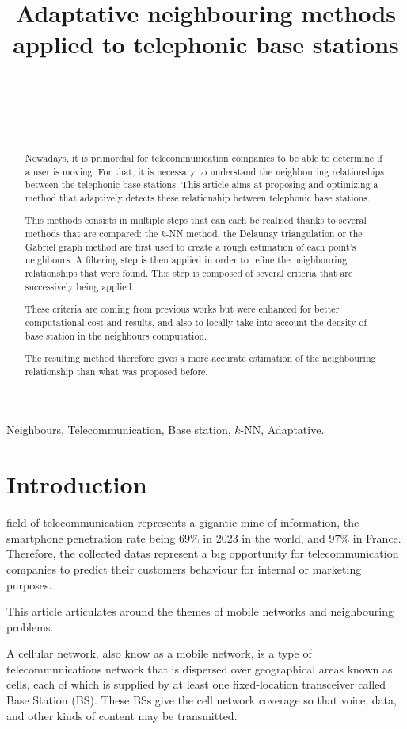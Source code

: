 \documentclass[lettersize,journal,english]{IEEEtran}
\title{Adaptative neighbouring methods applied to telephonic base stations}
\author{\IEEEauthorblockN{Paul MÉHAUD}\\
\IEEEauthorblockA{\textit{Intern at CTU in Prague} \\
\textit{INSA Rouen Normandie}\\
paul.mehaud@insa-rouen.fr}\\
\and
\IEEEauthorblockN{Brendan SÉVELLEC}\\
\IEEEauthorblockA{\textit{Intern at CTU in Prague} \\
\textit{INSA Rouen Normandie}\\
brendan.sevellec@insa-rouen.fr}}
\begin{document}
\maketitle

\begin{abstract}
    Nowadays, it is primordial for telecommunication companies to be able to determine if a user is moving. For that, it is necessary to understand the neighbouring relationships between the telephonic base stations. This article aims at proposing and optimizing a method that adaptively detects these relationship between telephonic base stations. 
    
    This methods consists in multiple steps that can each be realised thanks to several methods that are compared: the $k$-NN method, the Delaunay triangulation or the Gabriel graph method are first used to create a rough estimation of each point's neighbours. A filtering step is then applied in order to refine the neighbouring relationships that were found. This step is composed of several criteria that are successively being applied. 
    
    These criteria are coming from previous works but were enhanced for better computational cost and results, and also to locally take into account the density of base station in the neighbours computation. 
    
    The resulting method therefore gives a more accurate estimation of the neighbouring relationship than what was proposed before.
\end{abstract}

\begin{IEEEkeywords}
    Neighbours, Telecommunication, Base station, $k$-NN, Adaptative.
\end{IEEEkeywords}

\section{Introduction}
     field of telecommunication represents a gigantic mine of information, the smartphone penetration rate being $69\%$ in 2023 in the world, and $97\%$ in France. Therefore, the collected datas represent a big opportunity for telecommunication companies to predict their customers behaviour for internal or marketing purposes. 
    
    This article articulates around the themes of mobile networks and neighbouring problems. 

    A cellular network, also know as a mobile network, is a type of telecommunications network that is dispersed over geographical areas known as cells, each of which is supplied by at least one fixed-location transceiver called Base Station (BS). These BSs give the cell network coverage so that voice, data, and other kinds of content may be transmitted.
    
\end{document}
